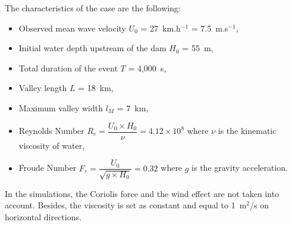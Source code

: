 The characteristics of the case are the following:
\begin{itemize}
  \itemsep0em
\item Observed mean wave velocity $U_0$ = 27~km.h$^{-1}$ = 7.5~m.s$^{-1}$,
\item Initial water depth upstream of the dam $H_0$ = 55~m,
\item Total duration of the event $T$ = 4,000~s,
\item Valley length $L$ = 18~km,
\item Maximum valley width $l_M$ = 7~km,
\item Reynolds Number \textbf{$R_e = \dfrac{U_0 \times H_0}{\nu} =  4.12 \times 10^8$}
where $\nu$ is the kinematic viscosity of water,
\item Froude Number \textbf{$F_r = \dfrac{U_0}{\sqrt{g \times H_0}} = 0.32$}
where $g$ is the gravity acceleration.
\end{itemize}

In the simulations, the Coriolis force and the wind effect are not taken into
account.
Besides, the viscosity is set as constant and equal to 1~m$^2$/s on horizontal
directions.

